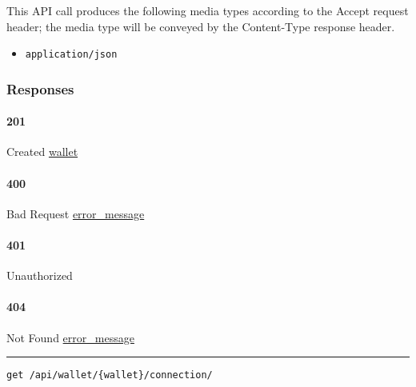 This API call produces the following media types according to the
{Accept} request header; the media type will be conveyed by the
{Content-Type} response header.

\begin{itemize}
\tightlist
\item
  \texttt{application/json}
\end{itemize}

\hypertarget{responses-13}{%
\subsubsection{Responses}\label{responses-13}}

\hypertarget{section-43}{%
\paragraph{201}\label{section-43}}

Created \protect\hyperlink{wallet}{wallet}

\hypertarget{section-44}{%
\paragraph{400}\label{section-44}}

Bad Request \protect\hyperlink{error_message}{error\_message}

\hypertarget{section-45}{%
\paragraph{401}\label{section-45}}

Unauthorized \protect\hyperlink{}{}

\hypertarget{section-46}{%
\paragraph{404}\label{section-46}}

Not Found \protect\hyperlink{error_message}{error\_message}

\begin{center}\rule{0.5\linewidth}{\linethickness}\end{center}

\protect\hypertarget{apiWalletWalletConnectionGet}{}{}

\begin{verbatim}
get /api/wallet/{wallet}/connection/
\end{verbatim}

